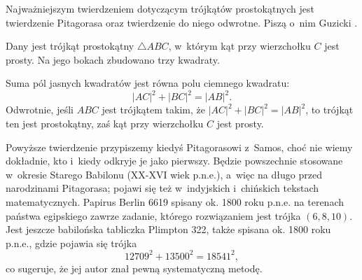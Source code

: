 %

Najważniejszym twierdzeniem dotyczącym trójkątów prostokątnych jest twierdzenie Pitagorasa oraz twierdzenie do niego odwrotne.
Piszą o~nim Guzicki \cite[s. 160]{guzicki_2021}.


\begin{theorem}[Pitagorasa]
\label{theorem_pythagorean}%
%
    Dany jest trójkąt prostokątny $\triangle ABC$, w~którym kąt przy wierzchołku $C$ jest prosty.
    Na jego bokach zbudowano trzy kwadraty.
    \begin{center}
\begin{comment}
        \begin{tikzpicture}[scale=.4]
        \tkzDefPoint(105:3){A}
        \tkzDefPoint(285:3){B}
        \tkzDefPoint(35:3){C}
        \tkzDefPoint(35:4.75){CC}
        \tkzMarkRightAngle[size=0.5](A,C,B)

        \tkzLabelPoint[above left](A){$A$}
        \tkzLabelPoint[below](B){$B$}
        \tkzLabelPoint[below left](CC){$C$}
        \tkzDefSquare(B,A)
        \tkzDrawPolygon[fill=black!50](B,A,tkzFirstPointResult, tkzSecondPointResult)
        \tkzDefSquare(C,B)
        \tkzDrawPolygon[fill=black!25](C,B,tkzFirstPointResult, tkzSecondPointResult)
        \tkzDefSquare(A,C)
        \tkzDrawPolygon[fill=black!25](A,C,tkzFirstPointResult, tkzSecondPointResult)
        \tkzDrawPolygon[line width=0.4mm](A,B,C)
    \end{tikzpicture}
\end{comment}
    \end{center}
    Suma pól jasnych kwadratów jest równa polu ciemnego kwadratu:
    \begin{equation}
        |AC|^2 + |BC|^2 = |AB|^2.
    \end{equation}
    Odwrotnie, jeśli $ABC$ jest trójkątem takim, że $|AC|^2 + |BC|^2 = |AB|^2$, to trójkąt ten jest prostokątny, zaś kąt przy wierzchołku $C$ jest prosty.
\end{theorem}

Powyższe twierdzenie przypiszemy kiedyś Pitagorasowi z~Samos, choć nie wiemy dokładnie, kto i~kiedy odkryje je jako pierwszy.
%
Będzie powszechnie stosowane w~okresie Starego Babilonu (XX-XVI wiek p.n.e.), a~więc na długo przed narodzinami Pitagorasa; pojawi się też w~indyjskich i~chińskich tekstach matematycznych.
Papirus Berlin 6619 spisany ok. 1800 roku p.n.e. na terenach państwa egipskiego zawrze zadanie, którego rozwiązaniem jest trójka $(6, 8, 10)$.
%
Jest jeszcze babilońska tabliczka Plimpton 322, także spisana ok. 1800 roku p.n.e., gdzie pojawia się trójka
\begin{equation}
    12709^2 + 13500^2 = 18541^2,
\end{equation}
co sugeruje, że jej autor znał pewną systematyczną metodę.
%

